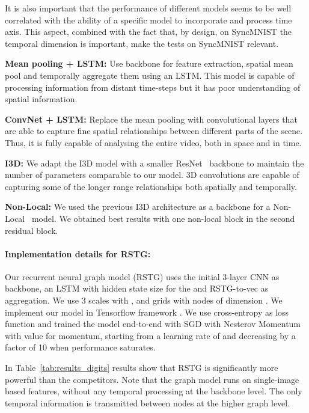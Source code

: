 \documentclass{article}
\begin{document}
It is also important that the performance of different models seems to be well correlated with the ability of a specific model to incorporate and process time axis. This aspect, combined with the fact that, by design, on SyncMNIST the temporal dimension is important, make the tests on SyncMNIST relevant. 


\textbf{Mean pooling + LSTM:} Use backbone for feature extraction, spatial mean pool and temporally aggregate them using an LSTM. This model is capable of processing information from distant time-steps but it has poor understanding of spatial information.

\textbf{ConvNet + LSTM:} Replace the mean pooling with convolutional layers that are able to capture fine spatial relationships between different parts of the scene. Thus, it is fully capable of analysing the entire video, both in space and in time.

\textbf{I3D:} We adapt the I3D model \cite{carreira2017quo} with a smaller ResNet~\cite{He2016DeepRL_resnet} backbone to maintain the number of parameters comparable to our model. 3D convolutions are capable of capturing some of the longer range relationships both spatially and temporally.

\textbf{Non-Local:}  We used the previous I3D architecture as a backbone for a Non-Local~\cite{wang2018non_local} model. We obtained best results with one non-local block in the second residual block.

\paragraph{Implementation details for RSTG:}
Our recurrent neural graph model (RSTG) uses the initial \mbox{3-layer} CNN as backbone, an LSTM with  hidden state size for the  and RSTG-to-vec as aggregation. We use 3 scales with ,  and  grids with nodes of dimension . We implement our model in Tensorflow framework \cite{tensorflow2015-whitepaper}. We use cross-entropy as loss function and trained the model end-to-end with SGD with Nesterov Momentum with value  for momentum, starting from a learning rate of  and decreasing by a factor of 10 when performance saturates. 

In Table~\ref{tab:results_digits} results  show that RSTG is significantly more powerful than the competitors. Note that the graph model runs on single-image based features, without any temporal processing at the backbone level. The only temporal information is transmitted between nodes at the higher graph level.
\end{document}

